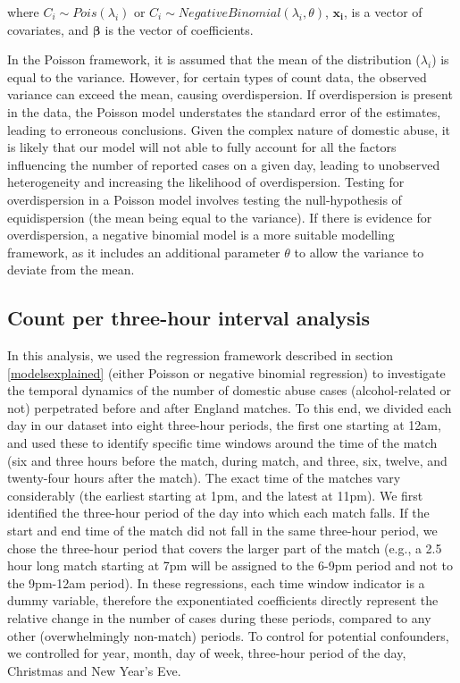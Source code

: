 \documentclass[12pt, a4paper]{article}
\newcommand{\vect}[1]{\boldsymbol{#1}}
\begin{document}
where 
$C_i \sim Pois(\lambda_i)$ or $C_i \sim Negative Binomial(\lambda_i,\theta)$, $\vect{x_i}$, is a vector of covariates, and $\boldsymbol{\beta}$ is the vector of coefficients.

In the Poisson framework, it is assumed that the mean of the distribution ($\lambda_i$) is equal to the variance. 
However, for certain types of count data, the observed variance can exceed the mean, causing overdispersion. 
If overdispersion is present in the data, the Poisson model understates the standard error of the estimates, leading to erroneous conclusions. 
Given the complex nature of domestic abuse, it is likely that our model will not able to fully account for all the factors influencing the number of reported cases on a given day, leading to unobserved heterogeneity and increasing the likelihood of overdispersion. 
Testing for overdispersion in a Poisson model involves testing the null-hypothesis of equidispersion (the mean being equal to the variance).
If there is evidence for overdispersion, a negative binomial model is a more suitable modelling framework, as it includes an additional parameter $\theta$ to allow the variance to deviate from the mean. 


\subsection{Count per three-hour interval analysis}

In this analysis, we used the regression framework described in section \ref{modelsexplained} (either Poisson or negative binomial regression) to investigate the temporal dynamics of the number of domestic abuse cases (alcohol-related or not) perpetrated before and after England matches. To this end, we divided each day in our dataset into eight three-hour periods, the first one starting at 12am, and used these to identify specific time windows around the time of the match (six and three hours before the match, during match, and three, six, twelve, and twenty-four hours after the match). The exact time of the matches vary considerably (the earliest starting at 1pm, and the latest at 11pm). We first identified the three-hour period of the day into which each match falls. If the start and end time of the match did not fall in the same three-hour period, we chose the three-hour period that covers the larger part of the match (e.g., a 2.5 hour long match starting at 7pm will be assigned to the 6-9pm period and not to the 9pm-12am period). In these regressions, each time window indicator is a dummy variable, therefore the exponentiated coefficients directly represent the relative change in the number of cases during these periods, compared to any other (overwhelmingly non-match) periods. To control for potential confounders, we controlled for year, month, day of week, three-hour period of the day, Christmas and New Year's Eve.
\end{document}

